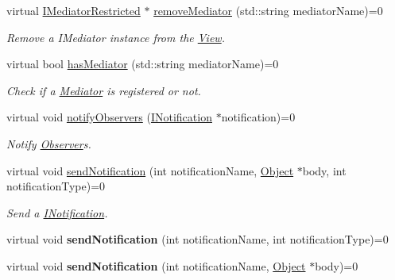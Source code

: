 \begin{DoxyCompactItemize}
virtual \hyperlink{class_pure_m_v_c_1_1_i_mediator_restricted}{IMediatorRestricted} $\ast$ \hyperlink{class_pure_m_v_c_1_1_i_facade_a216510b6052c29a37b810c3cbdeeca7c}{removeMediator} (std::string mediatorName)=0
\begin{DoxyCompactList}\small\item\em Remove a {\ttfamily IMediator} instance from the {\ttfamily \hyperlink{class_pure_m_v_c_1_1_view}{View}}. \item\end{DoxyCompactList}\item 
virtual bool \hyperlink{class_pure_m_v_c_1_1_i_facade_ab41b21fd725b18863d9ac8ada92984ce}{hasMediator} (std::string mediatorName)=0
\begin{DoxyCompactList}\small\item\em Check if a \hyperlink{class_pure_m_v_c_1_1_mediator}{Mediator} is registered or not. \item\end{DoxyCompactList}\item 
virtual void \hyperlink{class_pure_m_v_c_1_1_i_facade_acd9023ead1da9b309b3e85406cbc428b}{notifyObservers} (\hyperlink{class_pure_m_v_c_1_1_i_notification}{INotification} $\ast$notification)=0
\begin{DoxyCompactList}\small\item\em Notify {\ttfamily \hyperlink{class_pure_m_v_c_1_1_observer}{Observer}}s. \item\end{DoxyCompactList}\item 
virtual void \hyperlink{class_pure_m_v_c_1_1_i_notifier_a65e8333ccfea74138b79f84dac96af25}{sendNotification} (int notificationName, \hyperlink{class_pure_m_v_c_1_1_object}{Object} $\ast$body, int notificationType)=0
\begin{DoxyCompactList}\small\item\em Send a {\ttfamily \hyperlink{class_pure_m_v_c_1_1_i_notification}{INotification}}. \item\end{DoxyCompactList}\item 
\hypertarget{class_pure_m_v_c_1_1_i_notifier_ad9421945c1e0fd6d7ebbc136f9ecfba3}{
virtual void {\bfseries sendNotification} (int notificationName, int notificationType)=0}
\label{class_pure_m_v_c_1_1_i_notifier_ad9421945c1e0fd6d7ebbc136f9ecfba3}

\item 
\hypertarget{class_pure_m_v_c_1_1_i_notifier_a4d6bac0719be96948e4f7417489daeaa}{
virtual void {\bfseries sendNotification} (int notificationName, \hyperlink{class_pure_m_v_c_1_1_object}{Object} $\ast$body)=0}
\label{class_pure_m_v_c_1_1_i_notifier_a4d6bac0719be96948e4f7417489daeaa}


\end{DoxyCompactItemize}
